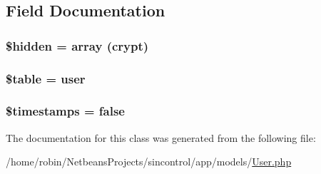 \subsection{Field Documentation}
\hypertarget{class_user_a4a374564d2858d8ae869a8fb890aad56}{}
\subsubsection[{\$hidden}]{\setlength{\rightskip}{0pt plus 5cm}\$hidden = array (\textquotesingle{}crypt\textquotesingle{})\hspace{0.3cm}{\ttfamily [protected]}}\label{class_user_a4a374564d2858d8ae869a8fb890aad56}
\hypertarget{class_user_ae8876a14058f368335baccf35af4a22b}{}
\subsubsection[{\$table}]{\setlength{\rightskip}{0pt plus 5cm}\$table = \textquotesingle{}user\textquotesingle{}\hspace{0.3cm}{\ttfamily [protected]}}\label{class_user_ae8876a14058f368335baccf35af4a22b}
\hypertarget{class_user_a51267c24c8fae742ed8f9be0ba6085ee}{}
\subsubsection[{\$timestamps}]{\setlength{\rightskip}{0pt plus 5cm}\$timestamps = false}\label{class_user_a51267c24c8fae742ed8f9be0ba6085ee}


The documentation for this class was generated from the following file\+:\begin{DoxyCompactItemize}
\item 
/home/robin/\+Netbeans\+Projects/sincontrol/app/models/\hyperlink{_user_8php}{User.\+php}\end{DoxyCompactItemize}
